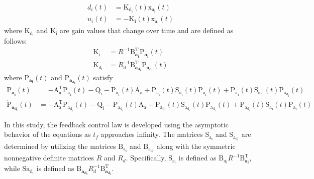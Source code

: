 \documentclass[3p,times]{elsarticle}
\begin{document}
\begin{align}
	{{d_i}}(t) &=\boldsymbol{{\mathrm{K_{d_i}}}}(t)\boldsymbol{{\mathrm{x_{a_i}}}}(t)\\
		{{u_i}}(t) &= -\boldsymbol{{\mathrm{K}}_{i}}(t) \boldsymbol{{\mathrm{x_{a_i}}}}(t)
\end{align}
where $\boldsymbol{{\mathrm{K_{d_i}}}}$ and $\boldsymbol{{\mathrm{K_i}}}$ are gain values that change over time and are defined as follows:
\begin{align}
	\boldsymbol{{\mathrm{K_i}}} &= {{{R}}^{-1}}\boldsymbol{{\mathrm{B}_{a_i}^\mathrm{T}}}\boldsymbol{{\mathrm{P}}_{a_i}}(t)\\
	\boldsymbol{{\mathrm{K_{d_i}}}} &= {{{R}}^{-1}_{d}}\boldsymbol{{\mathrm{B}_{a_{d_i}}^\mathrm{T}}}\boldsymbol{{\mathrm{P}}_{a_{d_i}}}(t)
\end{align}
where $\boldsymbol{{\mathrm{P}}_{a_i}}(t)$ and $\boldsymbol{{\mathrm{P}}_{a_{d_i}}}(t)$ satisfy
\begin{align}\label{coupled_riccatti_LQIDG}
            \boldsymbol{\dot{\mathrm{P}}_{a_i}}(t) &= -\boldsymbol{\mathrm{A^\mathrm{T}_a}}\boldsymbol{\mathrm{P_{a_i}}}(t) - \boldsymbol{\mathrm{Q_i}} - \boldsymbol{\mathrm{P_{a_i}}}(t)\boldsymbol{\mathrm{A_a}} +\boldsymbol{\mathrm{P_{a_i}}}(t)\boldsymbol{\mathrm{S_{a_i}}}(t)\boldsymbol{\mathrm{P_{a_i}}}(t) + \boldsymbol{\mathrm{P_{a_i}}}(t)\boldsymbol{\mathrm{S_{a_{d_i}}}}(t)\boldsymbol{\mathrm{P_{a_{d_i}}}}(t)\\
            \boldsymbol{\dot{\mathrm{P}}_{a_{d_i}}}(t) &= -\boldsymbol{\mathrm{A^\mathrm{T}_a}}\boldsymbol{\mathrm{P_{a_{d_i}}}}(t) - \boldsymbol{\mathrm{Q_{i}}} - \boldsymbol{\mathrm{P_{a_{d_i}}}}(t)\boldsymbol{\mathrm{A_a}} +\boldsymbol{\mathrm{P_{a_{d_i}}}}(t)\boldsymbol{\mathrm{S_{a_{d_i}}}}(t)\boldsymbol{\mathrm{P_{a_{d_i}}}}(t) + \boldsymbol{\mathrm{P_{a_{d_i}}}}(t)\boldsymbol{\mathrm{S_{a_i}}}(t)\boldsymbol{\mathrm{P_{a_i}}}(t)
\end{align}

In this study, the feedback control law is developed using the asymptotic behavior of the equations as $t_f$ approaches infinity. The matrices $\boldsymbol{\mathrm{S_{a_i}}}$ and $\boldsymbol{\mathrm{S_{a_{d_i}}}}$ are determined by utilizing the matrices $\boldsymbol{\mathrm{B_{a_i}}}$ and $\boldsymbol{\mathrm{B_{a_{d_i}}}}$ along with the symmetric nonnegative definite matrices ${{ R}}$ and ${{R_{d}}}$. Specifically, $\boldsymbol{\mathrm{S_{a_i}}}$ is defined as $\boldsymbol{\mathrm{B_{a_i}}}R^{-1}\boldsymbol{\mathrm{B}^\mathrm{T}_{a_i}}$, while $\boldsymbol{\mathrm{S{a_{d_i}}}}$ is defined as $\boldsymbol{\mathrm{B}_{a_{d_i}}}R_{d}^{-1}\boldsymbol{\mathrm{B}^\mathrm{T}_{a_{d_i}}}$.
\end{document}
